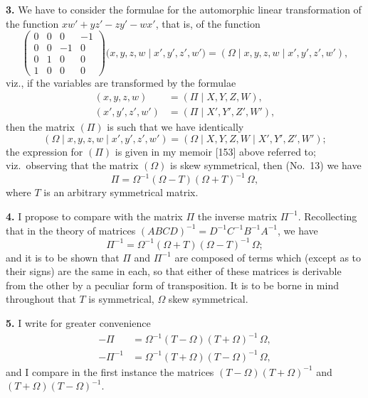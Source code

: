 \documentclass[11pt]{article}
\begin{document}
\textbf{3.} We have to consider the formulae for the automorphic linear transformation of the function $x w' + y z' - z y' - w x'$, that is, of the function
\[
\begin{pmatrix} 0 & 0 & 0 & -1 \\ 0 & 0 & -1 & 0 \\ 0 & 1 & 0 & 0 \\ 1 & 0 & 0 & 0 \end{pmatrix}
\bigl( x, y, z, w \mid x', y', z', w' \bigr) = (\Omega \mid x, y, z, w \mid x', y', z', w'),
\]
viz., if the variables are transformed by the formulae
\begin{align*}
(x, y, z, w) &= (\Pi \mid X, Y, Z, W), \\
(x', y', z', w') &= (\Pi \mid X', Y', Z', W'),
\end{align*}
then the matrix $(\Pi)$ is such that we have identically
\[
(\Omega \mid x, y, z, w \mid x', y', z', w') = (\Omega \mid X, Y, Z, W \mid X', Y', Z', W');
\]
the expression for $(\Pi)$ is given in my memoir [153] above referred to; viz.\ observing that the matrix $(\Omega)$ is skew symmetrical, then (No.~13) we have
\[
\Pi = \Omega^{-1}(\Omega - T)(\Omega + T)^{-1}\,\Omega,
\]
where $T$ is an arbitrary symmetrical matrix.

\textbf{4.} I propose to compare with the matrix $\Pi$ the inverse matrix $\Pi^{-1}$. Recollecting that in the theory of matrices $(ABCD)^{-1} = D^{-1} C^{-1} B^{-1} A^{-1}$, we have
\[
\Pi^{-1} = \Omega^{-1}(\Omega + T)(\Omega - T)^{-1}\,\Omega;
\]
and it is to be shown that $\Pi$ and $\Pi^{-1}$ are composed of terms which (except as to their signs) are the same in each, so that either of these matrices is derivable from the other by a peculiar form of transposition. It is to be borne in mind throughout that $T$ is symmetrical, $\Omega$ skew symmetrical.

\textbf{5.} I write for greater convenience
\begin{align*}
- \Pi &= \Omega^{-1}(T - \Omega)(T + \Omega)^{-1}\,\Omega, \\
- \Pi^{-1} &= \Omega^{-1}(T + \Omega)(T - \Omega)^{-1}\,\Omega,
\end{align*}
and I compare in the first instance the matrices $(T - \Omega)(T + \Omega)^{-1}$ and $(T + \Omega)(T - \Omega)^{-1}$.
\end{document}
